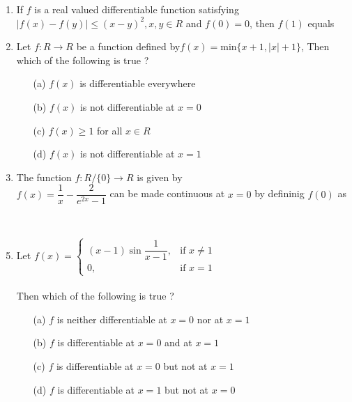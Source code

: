 \begin{enumerate}[label=\arabic*.,ref=\thesubsection.\theenumi]
\item If $f$ is a real valued differentiable function satisfying $|f(x)-f(y)|\leq (x-y)^2, x, y \in R$ and $f(0)=0$, then $f(1)$ equals
\begin{itemize}
\end{itemize}

\item Let $f:R \to R$ be a function defined by$f(x)=$min$\{x+1,|x|+1\}$, Then which of the following is true ?
\begin{itemize}
\item[(a)] $f(x)$ is differentiable everywhere
\item[(b)] $f(x)$ is not differentiable at $x=0$
\item[(c)] $f(x)\geq 1$ for all $x \in R$
\item[(d)] $f(x)$ is not differentiable at $x=1$\\
\end{itemize}

\item The function $f:R/\{0\} \to R$ is given by\\
$f(x)=\dfrac{1}{x}-\dfrac{2}{e^{2x}-1}$ can be made continuous at $x=0$ by defininig $f(0)$ as
\begin{itemize}
\end{itemize} \item[~]

\item Let $f(x)=\begin{cases}
(x-1)\sin\dfrac{1}{x-1}, &\text{if $x\neq 1$}\\
0, &\text{if $x=1$}
\end{cases}$ \\ \\Then which of the following is true ?
\begin{itemize}
\item[(a)] $f$ is neither differentiable at $x=0$ nor at $x=1$
\item[(b)] $f$ is differentiable at $x=0$ and at $x=1$
\item[(c)] $f$ is differentiable at $x=0$ but not at $x=1$
\item[(d)] $f$ is differentiable at $x=1$ but not at $x=0$\\
\end{itemize}


\end{enumerate}
